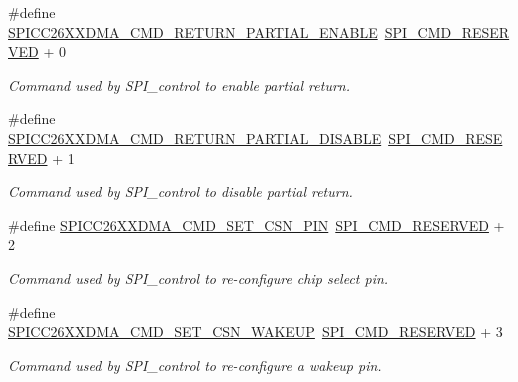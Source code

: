 \begin{DoxyCompactItemize}
\item 
\#define \hyperlink{group___s_p_i___c_m_d_ga348d271d5ad295c5e049e78d745c57e1}{S\+P\+I\+C\+C26\+X\+X\+D\+M\+A\+\_\+\+C\+M\+D\+\_\+\+R\+E\+T\+U\+R\+N\+\_\+\+P\+A\+R\+T\+I\+A\+L\+\_\+\+E\+N\+A\+B\+L\+E}~\hyperlink{group___s_p_i___c_o_n_t_r_o_l_ga3d23d16525ee76f77276472d8dea80b0}{S\+P\+I\+\_\+\+C\+M\+D\+\_\+\+R\+E\+S\+E\+R\+V\+E\+D} + 0
\begin{DoxyCompactList}\small\item\em Command used by S\+P\+I\+\_\+control to enable partial return. \end{DoxyCompactList}\item 
\#define \hyperlink{group___s_p_i___c_m_d_gaff8de4036abcdb2903cb5280120c30b4}{S\+P\+I\+C\+C26\+X\+X\+D\+M\+A\+\_\+\+C\+M\+D\+\_\+\+R\+E\+T\+U\+R\+N\+\_\+\+P\+A\+R\+T\+I\+A\+L\+\_\+\+D\+I\+S\+A\+B\+L\+E}~\hyperlink{group___s_p_i___c_o_n_t_r_o_l_ga3d23d16525ee76f77276472d8dea80b0}{S\+P\+I\+\_\+\+C\+M\+D\+\_\+\+R\+E\+S\+E\+R\+V\+E\+D} + 1
\begin{DoxyCompactList}\small\item\em Command used by S\+P\+I\+\_\+control to disable partial return. \end{DoxyCompactList}\item 
\#define \hyperlink{group___s_p_i___c_m_d_gab3ab03abd9ca073344acdcc6b442f9eb}{S\+P\+I\+C\+C26\+X\+X\+D\+M\+A\+\_\+\+C\+M\+D\+\_\+\+S\+E\+T\+\_\+\+C\+S\+N\+\_\+\+P\+I\+N}~\hyperlink{group___s_p_i___c_o_n_t_r_o_l_ga3d23d16525ee76f77276472d8dea80b0}{S\+P\+I\+\_\+\+C\+M\+D\+\_\+\+R\+E\+S\+E\+R\+V\+E\+D} + 2
\begin{DoxyCompactList}\small\item\em Command used by S\+P\+I\+\_\+control to re-\/configure chip select pin. \end{DoxyCompactList}\item 
\#define \hyperlink{group___s_p_i___c_m_d_gae07fd93964e63fc93795835eaa14b589}{S\+P\+I\+C\+C26\+X\+X\+D\+M\+A\+\_\+\+C\+M\+D\+\_\+\+S\+E\+T\+\_\+\+C\+S\+N\+\_\+\+W\+A\+K\+E\+U\+P}~\hyperlink{group___s_p_i___c_o_n_t_r_o_l_ga3d23d16525ee76f77276472d8dea80b0}{S\+P\+I\+\_\+\+C\+M\+D\+\_\+\+R\+E\+S\+E\+R\+V\+E\+D} + 3
\begin{DoxyCompactList}\small\item\em Command used by S\+P\+I\+\_\+control to re-\/configure a wakeup pin. \end{DoxyCompactList}\end{DoxyCompactItemize}


